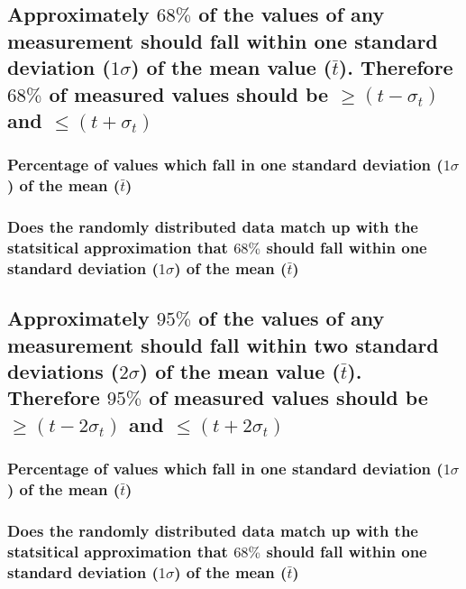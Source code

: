 \documentclass[11pt, letterpaper, includehead]{article}
\begin{document}
  \subsection{Approximately $68\%$ of the values of any measurement should fall within one 
  standard deviation ($1 \sigma$) of the mean value ($\bar{t}$). Therefore $68\%$ of measured 
  values should be $\geq (t - \sigma_t)$ and $\leq (t + \sigma_t)$} %

  \subsubsection{Percentage of values which fall in one standard deviation 
  ($1\sigma$) of the mean ($\bar{t}$)}

  \subsubsection{Does the randomly distributed data match up with the statsitical approximation
  that $68\%$ should fall within one standard deviation ($1\sigma$) of the mean ($\bar{t}$)}

  \subsection{Approximately $95\%$ of the values of any measurement should fall within two 
  standard deviations ($2 \sigma$) of the mean value ($\bar{t}$). Therefore $95\%$ of measured 
  values should be $\geq (t - 2 \sigma_t)$ and $\leq (t + 2 \sigma_t)$} %

  \subsubsection{Percentage of values which fall in one standard deviation 
  ($1\sigma$) of the mean ($\bar{t}$)}

  \subsubsection{Does the randomly distributed data match up with the statsitical approximation
  that $68\%$ should fall within one standard deviation ($1\sigma$) of the mean ($\bar{t}$)}
\end{document}
